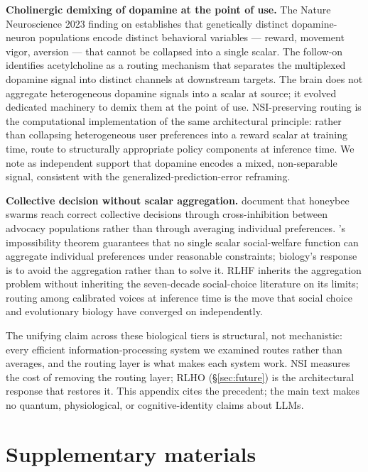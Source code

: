 \documentclass{article}
\begin{document}
\textbf{Cholinergic demixing of dopamine at the point of use.} The Nature Neuroscience 2023 finding on \citet{natureneuro2023dopamine} establishes that genetically distinct dopamine-neuron populations encode distinct behavioral variables --- reward, movement vigor, aversion --- that cannot be collapsed into a single scalar. The follow-on \citet{acetylcholine2026demix} identifies acetylcholine as a routing mechanism that separates the multiplexed dopamine signal into distinct channels at downstream targets. The brain does not aggregate heterogeneous dopamine signals into a scalar at source; it evolved dedicated machinery to demix them at the point of use. NSI-preserving routing is the computational implementation of the same architectural principle: rather than collapsing heterogeneous user preferences into a reward scalar at training time, route to structurally appropriate policy components at inference time. We note \citet{gardner2018dopamine} as independent support that dopamine encodes a mixed, non-separable signal, consistent with the generalized-prediction-error reframing.

\textbf{Collective decision without scalar aggregation.} \citet{seeley2012stop} document that honeybee swarms reach correct collective decisions through cross-inhibition between advocacy populations rather than through averaging individual preferences. \citet{arrow1950difficulty}'s impossibility theorem guarantees that no single scalar social-welfare function can aggregate individual preferences under reasonable constraints; biology's response is to avoid the aggregation rather than to solve it. RLHF inherits the aggregation problem without inheriting the seven-decade social-choice literature on its limits; routing among calibrated voices at inference time is the move that social choice and evolutionary biology have converged on independently.

The unifying claim across these biological tiers is structural, not mechanistic: every efficient information-processing system we examined routes rather than averages, and the routing layer is what makes each system work. NSI measures the cost of removing the routing layer; RLHO (\S\ref{sec:future}) is the architectural response that restores it. This appendix cites the precedent; the main text makes no quantum, physiological, or cognitive-identity claims about LLMs.

\section{Supplementary materials}
\label{app:supplementary}
\end{document}
